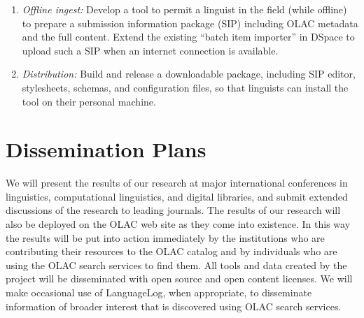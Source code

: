 \begin{enumerate}[label=\emph{\task\alph*}]
\item \emph{Offline ingest:}
  Develop a tool to permit a linguist in the field (while offline) to
  prepare a submission information package (SIP) including OLAC
  metadata and the full content. 
  Extend the existing ``batch item importer'' in DSpace to 
  upload such a SIP when an internet connection is available.
\item \emph{Distribution:}
  Build and release a downloadable package, including SIP editor,
  stylesheets, schemas, and configuration files, so that linguists
  can install the tool on their personal machine.
\end{enumerate}

\section{Dissemination Plans}
\label{sec:dissemination}

We will present the results of our research at major international
conferences in linguistics, computational linguistics, and
digital libraries, and submit extended discussions of the research to
leading journals.  The results of our research will also be deployed
on the OLAC web site as they come into existence. In this way the
results will be put into action immediately by the institutions
who are contributing their resources to the OLAC catalog and by 
individuals who are using the OLAC search services to find them.
All tools and data created by the project will be
disseminated with open source and open content licenses.
We will make occasional use of LanguageLog, when appropriate, to
disseminate information of broader interest that is discovered using
OLAC search services.
